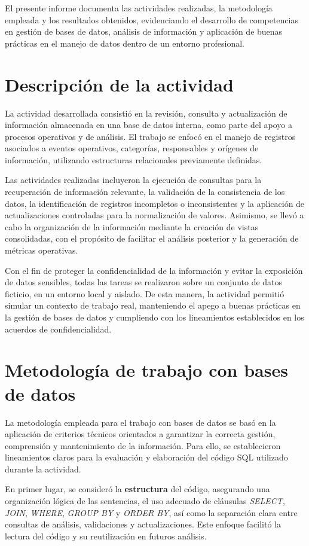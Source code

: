 \documentclass[12pt]{article}
\begin{document}
El presente informe documenta las actividades realizadas, la metodología empleada y los resultados obtenidos, evidenciando el desarrollo de competencias en gestión de bases de datos, análisis de información y aplicación de buenas prácticas en el manejo de datos dentro de un entorno profesional.


\section*{Descripción de la actividad}
La actividad desarrollada consistió en la revisión, consulta y actualización de información almacenada en una base de datos interna, como parte del apoyo a procesos operativos y de análisis. El trabajo se enfocó en el manejo de registros asociados a eventos operativos, categorías, responsables y orígenes de información, utilizando estructuras relacionales previamente definidas.

Las actividades realizadas incluyeron la ejecución de consultas para la recuperación de información relevante, la validación de la consistencia de los datos, la identificación de registros incompletos o inconsistentes y la aplicación de actualizaciones controladas para la normalización de valores. Asimismo, se llevó a cabo la organización de la información mediante la creación de vistas consolidadas, con el propósito de facilitar el análisis posterior y la generación de métricas operativas.

Con el fin de proteger la confidencialidad de la información y evitar la exposición de datos sensibles, todas las tareas se realizaron sobre un conjunto de datos ficticio, en un entorno local y aislado. De esta manera, la actividad permitió simular un contexto de trabajo real, manteniendo el apego a buenas prácticas en la gestión de bases de datos y cumpliendo con los lineamientos establecidos en los acuerdos de confidencialidad.


\section*{Metodología de trabajo con bases de datos}
La metodología empleada para el trabajo con bases de datos se basó en la aplicación de criterios técnicos orientados a garantizar la correcta gestión, comprensión y mantenimiento de la información. Para ello, se establecieron lineamientos claros para la evaluación y elaboración del código SQL utilizado durante la actividad.

En primer lugar, se consideró la \textbf{estructura} del código, asegurando una organización lógica de las sentencias, el uso adecuado de cláusulas \textit{SELECT}, \textit{JOIN}, \textit{WHERE}, \textit{GROUP BY} y \textit{ORDER BY}, así como la separación clara entre consultas de análisis, validaciones y actualizaciones. Este enfoque facilitó la lectura del código y su reutilización en futuros análisis.
\end{document}
